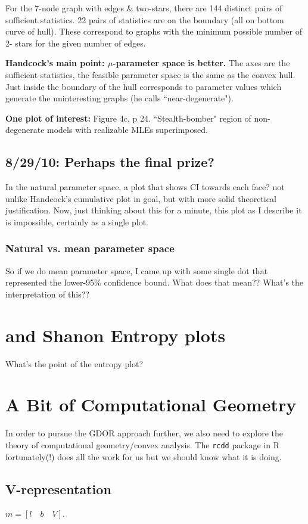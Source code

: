 \documentclass{amsbook}
\theoremstyle{definition}
\theoremstyle{remark}
\begin{document}
For the 7-node graph with edges \& two-stars, there are 144 distinct pairs of 
sufficient statistics.  22 pairs of statistics are on the boundary (all on bottom curve 
of hull).  These correspond to graphs with the minimum possible number of 2-
stars for the given number of edges.

\textbf{Handcock's main point: $\mu$-parameter space is better.}  The axes are the sufficient 
statistics,  the feasible parameter space is the same as the convex hull.  Just inside 
the boundary of the hull corresponds to parameter values which generate the 
uninteresting graphs (he calls ``near-degenerate").

\textbf{One plot of interest: } Figure 4c, p 24.  ``Stealth-bomber" region of non-
degenerate models with realizable MLEs superimposed.  

\subsection{8/29/10: Perhaps the final prize?}
In the natural parameter space, a plot that shows CI towards each face?  not unlike 
Handcock's cumulative plot in goal, but with more solid theoretical justification.  
Now, just thinking about this for a minute, this plot as I describe it is impossible, 
certainly as a single plot.  
\subsubsection{Natural vs. mean parameter space} So if we do mean parameter space, I 
came up with some single dot that represented the lower-95\% confidence bound.  What 
does that mean??  What's the interpretation of this??

\section{\citet{Rinaldo:2009} and Shanon Entropy plots}  
What's the point of the entropy plot?

\newpage
\section{A Bit of Computational Geometry}
In order to pursue the GDOR approach further, we also need to explore the theory of 
computational geometry/convex analysis.
The \texttt{rcdd} package in R \citep{rcdd} fortunately(!) does all the work for us but 
we should know what it is doing.

\subsection{V-representation}
$m = [l \quad b \quad V ]$.
\end{document}
